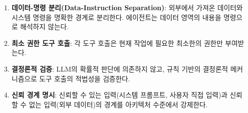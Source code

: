 \begin{enumerate}
 \item \textbf{데이터-명령 분리(Data-Instruction Separation)}: 외부에서 가져온 데이터와 시스템 명령을 명확한 경계로 분리한다. 에이전트는 데이터 영역의 내용을 명령으로 해석하지 않는다.
 \item \textbf{최소 권한 도구 호출}: 각 도구 호출은 현재 작업에 필요한 최소한의 권한만 부여받는다.
 \item \textbf{결정론적 검증}: LLM의 확률적 판단에 의존하지 않고, 규칙 기반의 결정론적 메커니즘으로 도구 호출의 적법성을 검증한다.
 \item \textbf{신뢰 경계 명시}: 신뢰할 수 있는 입력(시스템 프롬프트, 사용자 직접 입력)과 신뢰할 수 없는 입력(외부 데이터)의 경계를 아키텍처 수준에서 강제한다.
\end{enumerate}

